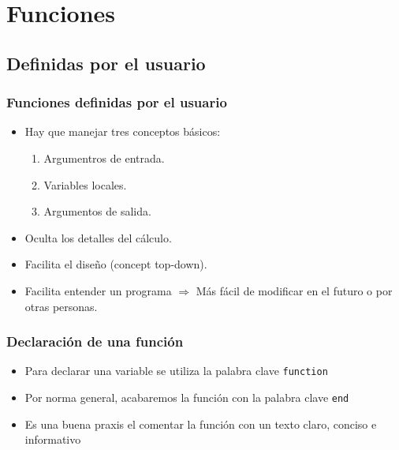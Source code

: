\section{Funciones}
\subsection{Definidas por el usuario}
\begin{frame}[label=func_usuario]
 \frametitle{Funciones definidas por el usuario}
 \begin{itemize}
  \item Hay que manejar tres conceptos básicos:
  \begin{enumerate}
   \item Argumentros de entrada.
   \item Variables locales.
   \item Argumentos de salida.
  \end{enumerate}
  \item Oculta los detalles del cálculo.
  \item Facilita el diseño (concept \alert{top-down}).
  \item Facilita entender un programa $\Rightarrow$ Más fácil de modificar en
    el futuro o por otras personas.
 \end{itemize}
\end{frame}
\begin{frame}[label=func_declaracion,fragile]
 \frametitle{Declaración de una función}
 \begin{itemize}
  \item Para declarar una variable se utiliza la palabra clave    
    \alert{\texttt{function}}
  \item Por norma general, acabaremos la función con la palabra clave
    \alert{\texttt{end}}
  \item Es una buena praxis el comentar la función con un texto claro, conciso e
    informativo
 \end{itemize}
 \begin{small}
  \lstI
 \end{small}
\end{frame}
